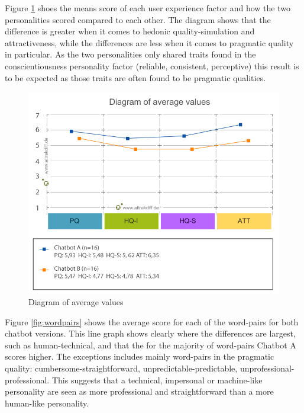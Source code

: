 Figure \ref{fig:diagval} shoes the means score of each user experience factor and how the two personalities scored compared to each other. The diagram shows that the difference is greater when it comes to hedonic quality-simulation and attractiveness, while the differences are less when it comes to pragmatic quality in particular. As the two personalities only shared traits found in the conscientiousness personality factor (reliable, consistent, perceptive) this result is to be expected as those traits are often found to be pragmatic qualities.

\begin{figure}[h]
    \centering
    \includegraphics[scale=0.5]{figures/Diagram-of-average-values.png}
    \caption{Diagram of average values}
    \label{fig:diagval}
\end{figure}
        
Figure \ref{fig:wordpairs} shows the average score for each of the word-pairs for both chatbot versions. This line graph shows clearly where the differences are largest, such as human-technical, and that the for the majority of word-pairs Chatbot A scores higher. The exceptions includes mainly word-pairs in the pragmatic quality: cumbersome-straightforward, unpredictable-predictable, unprofessional-professional. This suggests that a technical, impersonal or machine-like personality are seen as more professional and straightforward than a more human-like personality.


